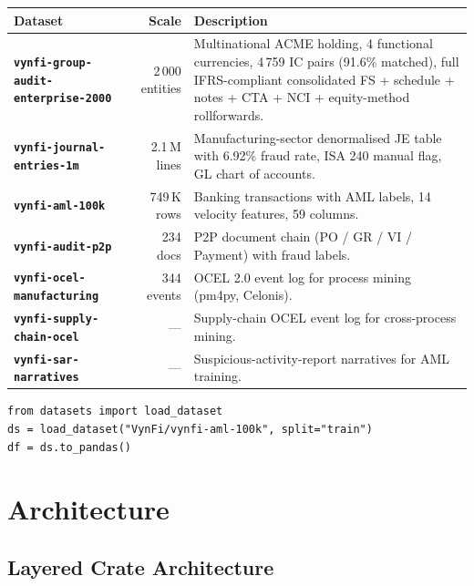 \documentclass[11pt,a4paper]{article}
\begin{document}
\renewcommand{\arraystretch}{1.25}
\begin{tabularx}{\textwidth}{@{}>{\bfseries\color{brand}}l r X@{}}
\toprule
\textbf{Dataset} & \textbf{Scale} & \textbf{Description} \\
\midrule
\texttt{vynfi-group-audit-enterprise-2000} & 2\,000 entities &
  Multinational ACME holding, 4 functional currencies, 4\,759 IC pairs
  (91.6\% matched), full IFRS-compliant consolidated FS + schedule + notes
  + CTA + NCI + equity-method rollforwards. \\
\texttt{vynfi-journal-entries-1m} & 2.1\,M lines &
  Manufacturing-sector denormalised JE table with 6.92\% fraud rate, ISA 240
  manual flag, GL chart of accounts. \\
\texttt{vynfi-aml-100k} & 749\,K rows &
  Banking transactions with AML labels, 14 velocity features, 59 columns. \\
\texttt{vynfi-audit-p2p} & 234 docs &
  P2P document chain (PO / GR / VI / Payment) with fraud labels. \\
\texttt{vynfi-ocel-manufacturing} & 344 events &
  OCEL 2.0 event log for process mining (pm4py, Celonis). \\
\texttt{vynfi-supply-chain-ocel} & --- &
  Supply-chain OCEL event log for cross-process mining. \\
\texttt{vynfi-sar-narratives} & --- &
  Suspicious-activity-report narratives for AML training. \\
\bottomrule
\end{tabularx}

\begin{tcolorbox}[notebox={Loading from Python}]
\small
\begin{verbatim}
from datasets import load_dataset
ds = load_dataset("VynFi/vynfi-aml-100k", split="train")
df = ds.to_pandas()
\end{verbatim}
\end{tcolorbox}

\newpage
\section{Architecture}

\subsection{Layered Crate Architecture}
\end{document}
